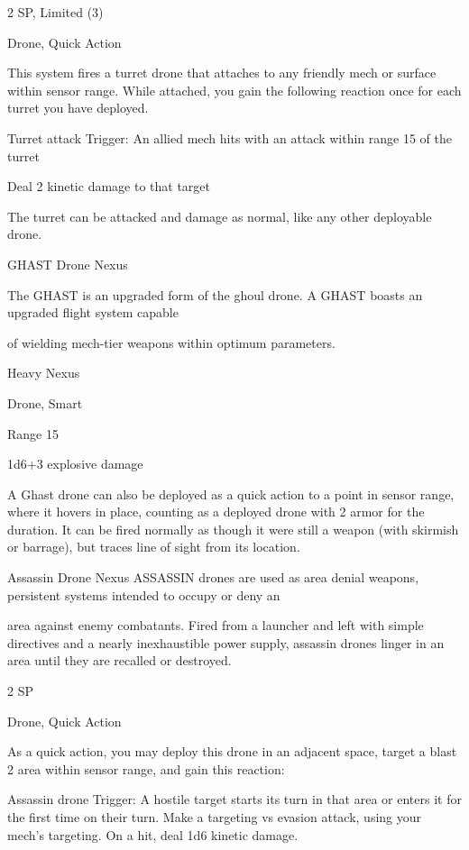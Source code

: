 2 SP, Limited (3)
 
Drone, Quick Action
 

This system fires a turret drone that attaches to any friendly mech or surface within sensor range.  
While attached, you gain the following reaction once for each turret you have deployed.
 
	        Turret attack  
	        Trigger: An allied mech hits with an attack within range 15 of the turret
 
	        Deal 2 kinetic damage to that target
 
The turret can be attacked and damage as normal, like any other deployable drone.
 

GHAST Drone Nexus  

The GHAST is an upgraded form of the ghoul drone. A GHAST boasts an upgraded flight system capable  

of wielding mech-tier weapons within optimum parameters.   

Heavy Nexus
 
Drone, Smart
 
Range 15
 
1d6+3 explosive damage
 

A Ghast drone can also be deployed as a quick action to a point in sensor range, where it hovers  
in place, counting as a deployed drone with 2 armor for the duration. It can be fired normally as  
though it were still a weapon (with skirmish or barrage), but traces line of sight from its location.
 

                                                                                                                


Assassin Drone Nexus  
ASSASSIN drones are used as area denial weapons, persistent systems intended to occupy or deny an  

area against enemy combatants. Fired from a launcher and left with simple directives and a nearly  
inexhaustible power supply, assassin drones linger in an area until they are recalled or destroyed.    

2 SP
 
Drone, Quick Action
 
As a quick action, you may deploy this drone in an adjacent space, target a blast 2 area within  
sensor range, and gain this reaction:
 
         Assassin drone  
         Trigger: A hostile target starts its turn in that area or enters it for the first time on their turn.  
         Make a targeting vs evasion attack, using your mech’s targeting. On a hit, deal 1d6 kinetic  
         damage.
 
